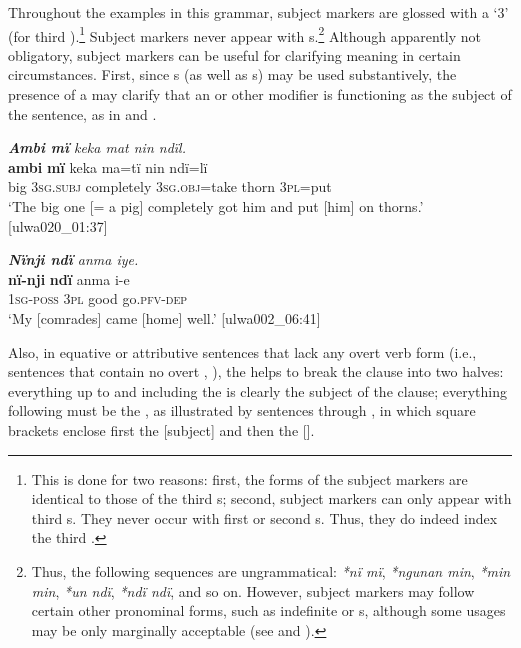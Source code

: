 Throughout the examples in this grammar, subject markers are glossed with a ‘3’ (for third ).\footnote{This is done for two reasons: first, the forms of the subject markers are identical to those of the third  s; second, subject markers can only appear with third  s. They never occur with first  or second  s. Thus, they do indeed index the third .} Subject markers never appear with s.\footnote{Thus, the following sequences are ungrammatical: \textit{*nï mï}, \textit{*ngunan min}, \textit{*min min}, \textit{*un ndï}, \textit{*ndï ndï}, and so on. However, subject markers may follow certain other pronominal forms, such as  indefinite or s, although some usages may be only marginally acceptable (see  and ).} Although apparently not obligatory, subject markers can be useful for clarifying meaning in certain circumstances. First, since s (as well as s) may be used substantively, the presence of a  may clarify that an  or other modifier is functioning as the subject of the sentence, as in  and .

\ea%
    \label{ex:det:11}
          \textit{\textbf{Ambi mï} keka mat nin ndïl.}\\
\gll    \textbf{ambi}  \textbf{mï}      keka      ma=tï      nin    ndï=lï\\
    big    3\textsc{sg.subj}  completely  3\textsc{sg.obj}=take  thorn  3\textsc{pl}=put\\
\glt `The big one [= a pig] completely got him and put [him] on thorns.’ [ulwa020\_01:37]
\z

\ea%
    \label{ex:det:12}
          \textit{\textbf{Nïnji ndï} anma iye.}\\
\gll    \textbf{nï-nji}    \textbf{ndï}  anma  i-e\\
    1\textsc{sg-poss}  \textsc{3pl}  good  go.\textsc{pfv-dep}\\
\glt `My [comrades] came [home] well.’ [ulwa002\_06:41]
\z

Also, in  equative or  attributive sentences that lack any overt verb form (i.e., sentences that contain no overt , ), the  helps to break the clause into two halves: everything up to and including the  is clearly the subject of the clause; everything following must be the , as illustrated by sentences  through , in which square brackets enclose first the [subject] and then the [].

